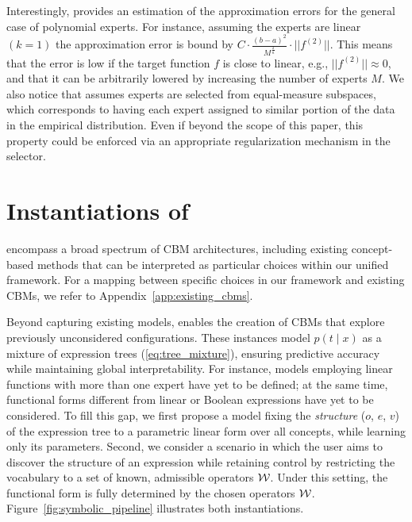 \documentclass{article}
\theoremstyle{plain}
\theoremstyle{definition}
\theoremstyle{remark}
\begin{document}
Interestingly,  provides an estimation of the approximation errors for the general case of polynomial experts. For instance, assuming the experts are linear $(k=1)$ the approximation error is bound by
$C \cdot \frac{(b-a)^{2}}{{M}^{\frac{2}{n}}} \cdot ||f^{(2)}||$.
This means that the error is low if the target function $f$ is close to linear, e.g., $||f^{(2)}|| \approx 0$, and that it can be arbitrarily lowered by increasing the number of experts $M$.
%
We also notice that  assumes experts are selected from equal-measure subspaces, which corresponds to having each expert assigned to similar portion of the data in the empirical distribution. Even if beyond the scope of this paper, this property could be enforced via an appropriate regularization mechanism in the selector.

\section{Instantiations of \classacrosingular}
\label{sec:new_models}
\classacro{} encompass a broad spectrum of CBM architectures, including existing concept-based methods that can be interpreted as particular choices within our unified framework. For a mapping between specific choices in our framework and existing CBMs, we refer to Appendix~\ref{app:existing_cbms}. 

Beyond capturing existing models, \classacro{} enables the creation of CBMs that explore previously unconsidered configurations. 
These instances model $p(t \mid x)$ as a mixture of expression trees (\cref{eq:tree_mixture}), ensuring predictive accuracy while maintaining global interpretability. 
For instance, models employing linear functions with more than one expert have yet to be defined; at the same time, functional forms different from linear or Boolean expressions have yet to be considered. To fill this gap, we first propose a model fixing the \emph{structure} ($o$, $e$, $v$) of the expression tree to a parametric linear form over all concepts, while learning only its parameters. Second, we consider a scenario in which the user aims to discover the structure of an expression while retaining control by restricting the vocabulary to a set of known, admissible operators $\mathcal{W}$. Under this setting, the functional form is fully determined by the chosen operators $\mathcal{W}$. Figure~\ref{fig:symbolic_pipeline} illustrates both instantiations.
\end{document}
